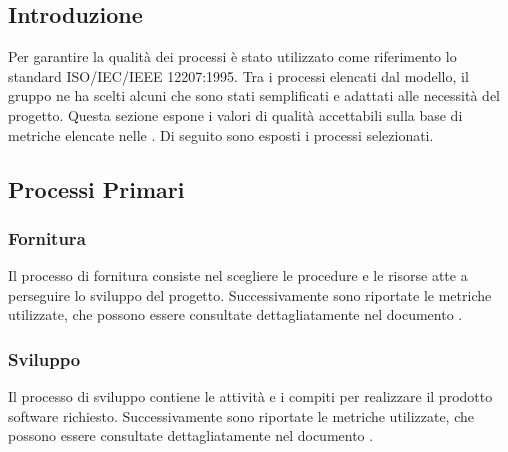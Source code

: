 
\subsection{Introduzione}
Per garantire la qualità dei processi è stato utilizzato come riferimento lo standard ISO/IEC/IEEE 12207:1995. Tra i processi elencati dal modello, il gruppo ne ha scelti alcuni che sono stati semplificati e adattati alle necessità del progetto. Questa sezione espone i valori di qualità accettabili sulla base di metriche elencate nelle . Di seguito sono esposti i processi selezionati.

\subsection{Processi Primari}

\subsubsection{Fornitura}
Il processo di fornitura consiste nel scegliere le procedure e le risorse atte a perseguire lo sviluppo del progetto. Successivamente sono riportate le metriche utilizzate, che possono essere consultate dettagliatamente nel documento .

\subsubsection{Sviluppo}
Il processo di sviluppo contiene le attività e i compiti per realizzare il prodotto software richiesto. Successivamente sono riportate le metriche utilizzate, che possono essere consultate dettagliatamente nel documento .


